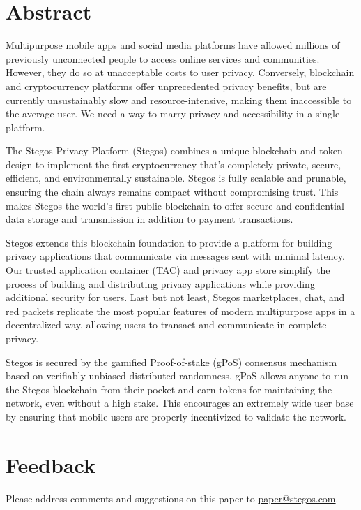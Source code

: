 \documentclass[8pt,fleqn,openany]{book}
\begin{document}
	\newpage
	
	\tableofcontents\newpage
	
	\section{Abstract}
	Multipurpose mobile apps and social media platforms have allowed millions of previously unconnected people to access online services and communities. However, they do so at unacceptable costs to user privacy. Conversely, blockchain and cryptocurrency platforms offer unprecedented privacy benefits, but are currently unsustainably slow and resource-intensive, making them inaccessible to the average user. We need a way to marry privacy and accessibility in a single platform.
	
	The Stegos Privacy Platform (Stegos) combines a unique blockchain and token design to implement the first cryptocurrency that’s completely private, secure, efficient, and environmentally sustainable. Stegos is fully scalable and prunable, ensuring the chain always remains compact without compromising trust. This makes Stegos the world’s first public blockchain to offer secure and confidential data storage and transmission in addition to payment transactions. 
	
	Stegos extends this blockchain foundation to provide a platform for building privacy applications that communicate via messages sent with minimal latency. Our trusted application container (TAC) and privacy app store simplify the process of building and distributing privacy applications while providing additional security for users. Last but not least, Stegos marketplaces, chat, and red packets replicate the most popular features of modern multipurpose apps in a decentralized way, allowing users to transact and communicate in complete privacy.
	
	Stegos is secured by the gamified Proof-of-stake (gPoS) consensus mechanism based on verifiably unbiased distributed randomness. gPoS allows anyone to run the Stegos blockchain from their pocket and earn tokens for maintaining the network, even without a high stake. This encourages an extremely wide user base by ensuring that mobile users are properly incentivized to validate the network.
	\section{Feedback}
	
	Please address comments and suggestions on this paper to \href{mailto:paper@stegos.com}{paper@stegos.com}.
	
\end{document}
